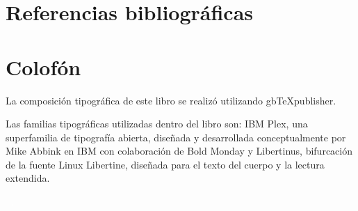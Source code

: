 			\chapter{Referencias bibliográficas}
			\printbibliography[heading=none]
			\fi
		\fi
	\fi
\fi





\ifPDF
\printindex[names]
\printindex[concepto]
\printindex[onomastico]
\else
	\ifBNPDF
	\printindex[names]
	\printindex[concepto]
	\printindex[onomastico]
	\fi
\fi

\chapter{Colofón}

La composición tipográfica de este libro se realizó utilizando gbTeXpublisher.

Las familias tipográficas utilizadas dentro del libro son: IBM Plex, una superfamilia de tipografía abierta, diseñada y desarrollada conceptualmente por Mike Abbink en IBM con colaboración de Bold Monday y Libertinus, bifurcación de la fuente Linux Libertine, diseñada para el texto del cuerpo y la lectura extendida.

\ifPDF
\newpage
\thispagestyle{empty}
{\textcolor{white}{.}}
\else
	\ifBNPDF
	\newpage
	\thispagestyle{empty}
	{\textcolor{white}{.}}
	\fi
\fi





